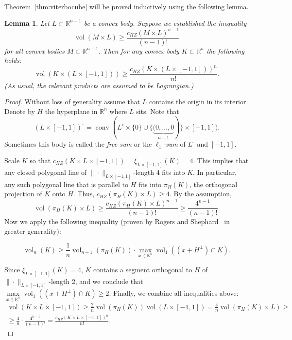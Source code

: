 \documentclass[12pt,a4paper,oneside]{amsart}
\newtheorem{lemma}[theorem]{Lemma}
\theoremstyle{definition}
\theoremstyle{remark}
\numberwithin{equation}{section}
\DeclareMathOperator{\volu}{vol}
\DeclareMathOperator{\conv}{conv}
\begin{document}
Theorem~\ref{thm:viterbocube} will be proved inductively using the following lemma.

\begin{lemma}
\label{lem:viterboaddsegment}
Let $L \subset \mathbb{R}^{n-1}$ be a convex body. Suppose we established the inequality
$$
\volu (M \times L) \ge \frac{c_{HZ}(M \times L)^{n-1}}{(n-1)!}
$$
for all convex bodies $M \subset \mathbb{R}^{n-1}$. Then for any convex body $K \subset \mathbb{R}^n$ the following holds:
$$
\volu (K \times (L \times [-1,1])) \ge \frac{c_{HZ}(K \times (L \times [-1,1]))^n}{n!}.
$$
(As usual, the relevant products are assumed to be Lagrangian.)
\end{lemma}

\begin{proof}
Without loss of generality assume that $L$ contains the origin in its interior. Denote by $H$ the hyperplane in $\mathbb{R}^n$ where $L$ sits.
Note that
$$
(L \times [-1,1])^\circ = \conv (L^\circ \times \{0\} \cup \{\underbrace{(0,\ldots,0}_{n-1})\} \times [-1,1]).
$$
Sometimes this body is called the \emph{free sum} or the \emph{$\ell_1$-sum} of $L^\circ$ and $[-1,1]$.

Scale $K$ so that $c_{HZ}(K \times L \times [-1,1]) = \xi_{L \times [-1,1]}(K) = 4$. This implies that any closed polygonal line of $\|\cdot\|_{L \times [-1,1]}$-length 4 fits into $K$. In particular, any such polygonal line that is parallel to $H$ fits into $\pi_H(K)$, the orthogonal projection of $K$ onto $H$. Thus, $c_{HZ}(\pi_H(K) \times L) \ge 4$. By the assumption,
$$
\volu (\pi_H(K) \times L) \ge \frac{c_{HZ}(\pi_H(K) \times L)^{n-1}}{(n-1)!} \ge \frac{4^{n-1}}{(n-1)!}.
$$
Now we apply the following inequality (proven by Rogers and Shephard~\cite{rogers1958convex} in greater generality):

$$
\volu_n (K) \ge \frac{1}{n} \volu_{n-1} (\pi_H(K)) \cdot \max\limits_{x \in \mathbb{R}^n} \volu_1 ((x + H^\bot) \cap K).
$$

Since $\xi_{L \times [-1,1]}(K) = 4$, $K$ contains a segment orthogonal to $H$ of $\|\cdot\|_{L \times [-1,1]}$-length 2, and we conclude that $\max\limits_{x \in \mathbb{R}^n} \volu_1 ((x + H^\bot) \cap K) \ge 2$.
Finally, we combine all inequalities above:
\begin{multline*}
\volu (K \times L \times [-1,1]) \ge \frac{2}{n} \volu (\pi_H(K)) \volu(L \times [-1,1]) = \frac{4}{n} \volu (\pi_H(K) \times L) \ge \\
\ge \frac{4}{n} \cdot \frac{4^{n-1}}{(n-1)!} = \frac{c_{HZ}(K \times L \times [-1,1])^n}{n!}.
\end{multline*}

\end{proof}
\end{document}
